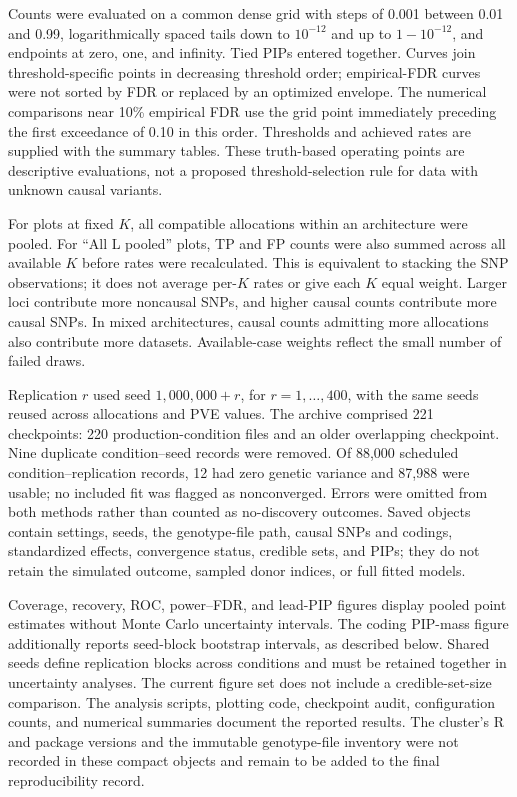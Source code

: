 \documentclass[12pt]{article}
\begin{document}
Counts were evaluated on a common dense grid with steps of 0.001
between 0.01 and 0.99, logarithmically spaced tails down to $10^{-12}$
and up to $1-10^{-12}$, and endpoints at zero, one, and infinity.
Tied PIPs entered together. Curves join threshold-specific points in
decreasing threshold order; empirical-FDR curves were not sorted by
FDR or replaced by an optimized envelope. The numerical comparisons
near 10\% empirical FDR use the grid point immediately preceding the
first exceedance of 0.10 in this order. Thresholds and achieved rates
are supplied with the summary tables. These truth-based operating
points are descriptive evaluations, not a proposed threshold-selection
rule for data with unknown causal variants.

For plots at fixed $K$, all compatible allocations within an architecture
were pooled. For ``All L pooled'' plots, TP and FP counts were also
summed across all available $K$ before rates were recalculated. This is
equivalent to stacking the SNP observations; it does not average
per-$K$ rates or give each $K$ equal weight. Larger loci contribute
more noncausal SNPs, and higher causal counts contribute more causal
SNPs. In mixed architectures, causal counts admitting more allocations
also contribute more datasets. Available-case weights reflect the
small number of failed draws.

Replication $r$ used seed $1{,}000{,}000+r$, for $r=1,\ldots,400$,
with the same seeds reused across allocations and PVE values. The
archive comprised 221 checkpoints: 220 production-condition files and
an older overlapping checkpoint. Nine duplicate condition--seed records
were removed. Of 88,000 scheduled condition--replication records,
12 had zero genetic variance and 87,988 were usable; no included fit
was flagged as nonconverged. Errors were omitted from both methods
rather than counted as no-discovery outcomes. Saved objects contain
settings, seeds, the genotype-file path, causal SNPs and codings,
standardized effects, convergence status, credible sets, and PIPs;
they do not retain the simulated outcome, sampled donor indices, or
full fitted models.

Coverage, recovery, ROC, power--FDR, and lead-PIP figures display
pooled point estimates without Monte Carlo uncertainty intervals.
The coding PIP-mass figure additionally reports seed-block bootstrap
intervals, as described below. Shared seeds define replication blocks
across conditions and must be retained together in uncertainty analyses.
The current figure set does not include a credible-set-size comparison.
The analysis scripts, plotting code, checkpoint audit, configuration
counts, and numerical summaries document the reported results. The
cluster's R and package versions and the immutable genotype-file
inventory were not recorded in these compact objects and remain to be
added to the final reproducibility record.
\end{document}
